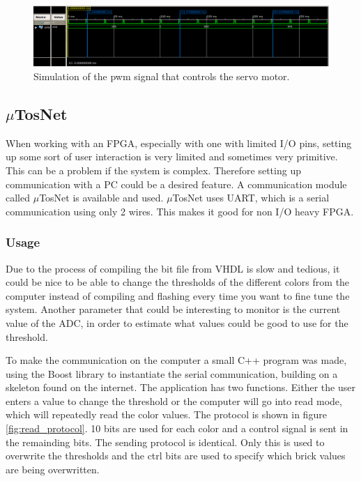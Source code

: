 \begin{figure}[h]
\centering
    \includegraphics[width=0.9\linewidth]{img/pwm_simulation}
    \caption{Simulation of the pwm signal that controls the servo motor.}
    \label{fig:pwm_simulation}
\end{figure}

\subsection{$\mu$TosNet}
When working with an FPGA, especially with one with limited I/O pins, setting up some sort of user interaction is very limited and sometimes very primitive. This can be a problem if the system is complex. Therefore setting up communication with a PC could be a desired feature. A communication module called $\mu$TosNet is available and used. $\mu$TosNet uses UART, which is a serial communication using only 2 wires. This makes it good for non I/O heavy FPGA. 

\subsubsection{Usage}
Due to the process of compiling the bit file from VHDL is slow and tedious, it could be nice to be able to change the thresholds of the different colors from the computer instead of compiling and flashing every time you want to fine tune the system. Another parameter that could be interesting to monitor is the current value of the ADC, in order to estimate what values could be good to use for the threshold. 

To make the communication on the computer a small C++ program was made, using the Boost library to instantiate the serial communication, building on a skeleton found on the internet\cite{url:serial}.
The application has two functions.
Either the user enters a value to change the threshold or the computer will go into read mode, which will repeatedly read the color values.
The protocol is shown in figure \ref{fig:read_protocol}. 10 bits are used for each color and a control signal is sent in the remainding bits. %
The sending protocol is identical. Only this is used to overwrite the thresholds and the ctrl bits are used to specify which brick values are being overwritten.

